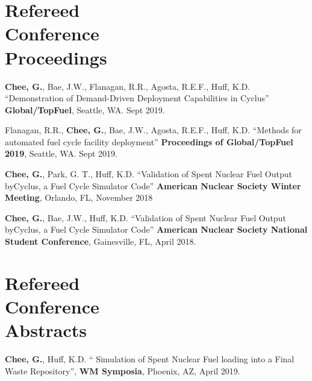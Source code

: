 \documentclass[margin,line]{resume}
\begin{document}
\begin{resume}
    \section{\mysidestyle Refereed\\Conference\\Proceedings}
    \begin{bibenum}
    \item \textbf{Chee, G.}, Bae, J.W., Flanagan, R.R., Agosta, R.E.F., 
        Huff, K.D. ``Demonstration of Demand-Driven Deployment Capabilities in Cyclus''
         \textbf{Global/TopFuel}, Seattle, WA. Sept 2019.
    \item Flanagan, R.R., \textbf{Chee, G.}, Bae, J.W., Agosta, R.E.F., 
    Huff, K.D. ``Methods for automated fuel cycle facility deployment''
     \textbf{Proceedings of Global/TopFuel 2019}, Seattle, WA. Sept 2019.
     \item \textbf{Chee, G.}, Park, G. T., 
    Huff, K.D. ``Validation of Spent Nuclear Fuel Output byCyclus, a Fuel Cycle Simulator Code''
     \textbf{ American Nuclear Society Winter Meeting}, Orlando, FL, November 2018
     \item \textbf{Chee, G.}, Bae, J.W., 
    Huff, K.D. ``Validation of Spent Nuclear Fuel Output byCyclus, a Fuel Cycle Simulator Code''
     \textbf{ American Nuclear Society National Student Conference}, Gainesville, FL, April 2018.
    \end{bibenum}
    \section{\mysidestyle Refereed\\Conference\\Abstracts}
    \begin{bibenum} 
    \item \textbf{Chee, G.}, Huff, K.D. `` Simulation of Spent Nuclear Fuel loading into a Final Waste 
    Repository'', \textbf{WM Symposia}, Phoenix, AZ, April 2019.
    \end{bibenum}
    \vspace{0.5em}

\end{resume}
\end{document}
